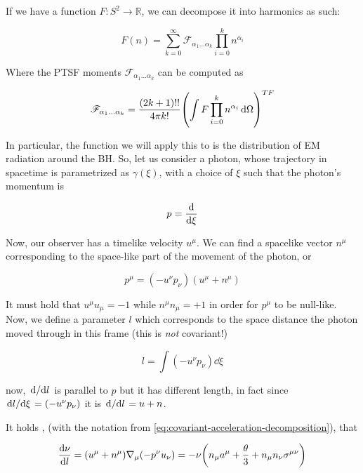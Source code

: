 \documentclass[main.tex]{subfiles}
\begin{document}
If we have a function \(F\colon S^2 \rightarrow \mathbb R\), we can decompose it into harmonics as such:

\begin{equation}
    F(n) = \sum _{k=0}   ^{\infty}
    \mathscr F_{\alpha_1 \dots \alpha_k} \prod_{i=0}^k n^{\alpha_i}
\end{equation}

Where the PTSF moments \(\mathscr F_{\alpha_1 \dots \alpha_k}\) can be computed as

\begin{equation}
    \mathscr F_{\alpha_1 \dots \alpha_k} =
    \frac{(2k+1)!!}{4 \pi k!} \qty(\int F \prod_{i=0}^k n^{\alpha_i}  \dd{\Omega}  )^{TF}
\end{equation}

In particular, the function we will apply this to is the distribution of EM radiation around the BH. So, let us consider a photon, whose trajectory in spacetime is parametrized as \(\gamma(\xi)\), with a choice of \(\xi\) such that the photon's momentum is

\begin{equation}
    p = \dv{}{\xi}
\end{equation}

Now, our observer has a timelike velocity \(u^\mu\). We can find a spacelike vector \(n^\mu\) corresponding to the space-like part of the movement of the photon, or

\begin{equation}
    p^\mu = (- u^\nu p_\nu) (u^\mu + n^\mu)
\end{equation}

It must hold that \(u^\mu u_\mu = -1 \) while \(n^\mu n_\mu = +1 \) in order for \(p^\mu\) to be null-like.
Now, we define a parameter \(l\) which corresponds to the space distance the photon moved through in this frame (this is \emph{not} covariant!)

\begin{equation}
    l = \int  (-u^\nu p_\nu) \dd{\xi}
\end{equation}

now, \(\dv*{}{l} \) is parallel to \(p\) but it has different length, in fact since \(\dv*{l}{\xi} = (-u^\nu p_\nu) \) it is \(\dv*{}{l} = u + n \).

It holds \cite[eq. 2.17]{Thorne:1981feb}, (with the notation from \eqref{eq:covariant-acceleration-decomposition}),  that

\begin{equation}
  \dv{\nu}{l}  = (u^\mu + n^\mu) \nabla_\mu (-p^\nu u_\nu) = - \nu \qty(n_\mu a^\mu  + \frac{\theta}{3} + n_\mu n_\nu \sigma^{\mu\nu})
\end{equation}
\end{document}
